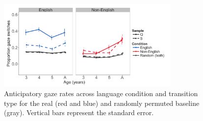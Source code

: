 \documentclass[authoryear, 12pt]{elsarticle}
\begin{document}
\begin{figure}[h]
\begin{center}
\includegraphics[width=0.8\textwidth]{figures/E1-samples-by-lang-groups-trans-types.png}
\end{center}
\caption{Anticipatory gaze rates across language condition and transition type for the real (red and blue) and randomly permuted baseline (gray). Vertical bars represent the standard error.} 
\label{fig:E1-randvsreal}
\end{figure}
\end{document}
